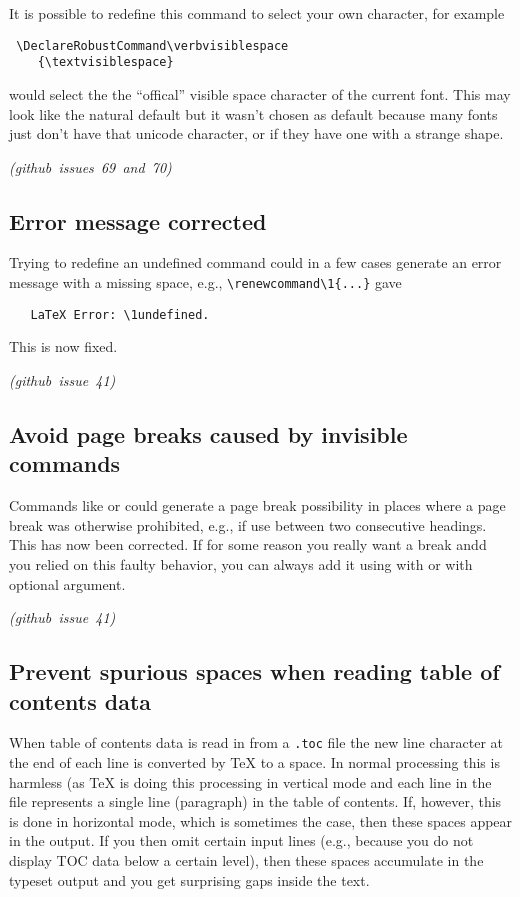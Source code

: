 \documentclass{ltnews}
\newcommand\githubissue[2][]{\ifhmode\unskip\fi
     \quad\penalty500\strut\nobreak\hfill
     \mbox{\small\itshape(github issue#1 #2)}\par}
\begin{document}
It is possible to redefine this command to select your own character,
for example
\begin{verbatim}
 \DeclareRobustCommand\verbvisiblespace
    {\textvisiblespace}
\end{verbatim}
would select the the ``offical'' visible space character of the
current font. This may look like the natural default but it wasn't
chosen as default because many fonts just don't have that unicode
character, or if they have one with a strange shape.
%
\githubissue[s]{69 and 70}

        
\subsection{Error message corrected}
Trying to redefine an undefined command could in a few cases generate
an error message with a missing space, e.g.,
\verb=\renewcommand\1{...}= gave
\begin{verbatim}
   LaTeX Error: \1undefined.
\end{verbatim}
This is now fixed.
%
\githubissue{41}


\subsection{Avoid page breaks caused by invisible commands}

Commands like  or  could generate a page break
possibility in places where a page break was otherwise prohibited,
e.g., if use between two consecutive headings. This has now been
corrected. If for some reason you really want a break andd you relied
on this faulty behavior, you can always add it using 
with or with optional argument.
%
\githubissue{41}



\subsection{Prevent spurious spaces when reading table of contents data}

When table of contents data is read in from a \texttt{.toc} file the
new line character at the end of each line is converted by \TeX{} to a
space. In normal processing this is harmless (as \TeX{} is doing this
processing in vertical mode and each line in the file represents a
single line (paragraph) in the table of contents. If, however, this is
done in horizontal mode, which is sometimes the case, then these
spaces appear in the output. If you then omit certain input lines
(e.g., because you do not display TOC data below a certain level),
then these spaces accumulate in the typeset output and you get
surprising gaps inside the text.
\end{document}

